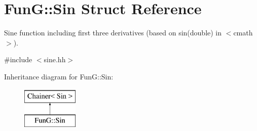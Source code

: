 \hypertarget{structFunG_1_1Sin}{\section{Fun\-G\-:\-:Sin Struct Reference}
\label{structFunG_1_1Sin}
}


Sine function including first three derivatives (based on sin(double) in $<$cmath$>$).  




{\ttfamily \#include $<$sine.\-hh$>$}

Inheritance diagram for Fun\-G\-:\-:Sin\-:\begin{figure}[H]
\begin{center}
\leavevmode
\includegraphics[height=2.000000cm]{structFunG_1_1Sin}
\end{center}
\end{figure}
